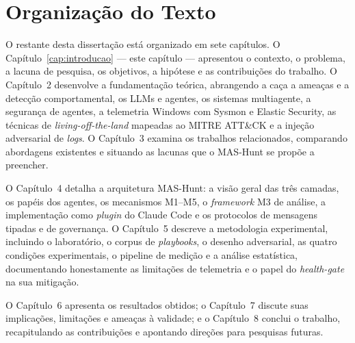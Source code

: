 \section{Organização do Texto}
\label{sec:organizacao}

O restante desta dissertação está organizado em sete capítulos. O
Capítulo~\ref{cap:introducao} — este capítulo — apresentou o contexto, o
problema, a lacuna de pesquisa, os objetivos, a hipótese e as contribuições do
trabalho. O Capítulo~2 desenvolve a fundamentação teórica, abrangendo a caça a
ameaças e a detecção comportamental, os LLMs e agentes, os sistemas multiagente,
a segurança de agentes, a telemetria Windows com Sysmon e Elastic Security, as
técnicas de \emph{living-off-the-land} mapeadas ao MITRE ATT\&CK e a injeção
adversarial de \emph{logs}. O Capítulo~3 examina os trabalhos relacionados,
comparando abordagens existentes e situando as lacunas que o MAS-Hunt se propõe a
preencher.

O Capítulo~4 detalha a arquitetura MAS-Hunt: a visão geral das três camadas, os
papéis dos agentes, os mecanismos M1--M5, o \emph{framework} M3 de análise, a
implementação como \emph{plugin} do Claude Code e os protocolos de mensagens
tipadas e de governança. O Capítulo~5 descreve a metodologia experimental,
incluindo o laboratório, o corpus de \emph{playbooks}, o desenho adversarial, as
quatro condições experimentais, o pipeline de medição e a análise estatística,
documentando honestamente as limitações de telemetria e o papel do
\emph{health-gate} na sua mitigação.

O Capítulo~6 apresenta os resultados obtidos; o Capítulo~7 discute suas
implicações, limitações e ameaças à validade; e o Capítulo~8 conclui o trabalho,
recapitulando as contribuições e apontando direções para pesquisas futuras.
